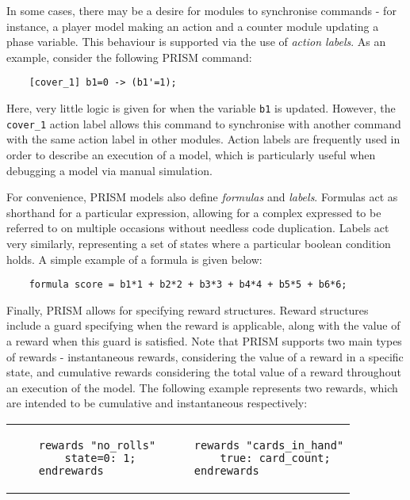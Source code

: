 In some cases, there may be a desire for modules to synchronise commands - for instance, a player model making an action and a counter module updating a phase variable. This behaviour is supported via the use of \emph{action labels}. As an example, consider the following PRISM command:

\begin{verbatim}
    [cover_1] b1=0 -> (b1'=1);
\end{verbatim}

Here, very little logic is given for when the variable \verb+b1+ is updated. However, the \verb+cover_1+ action label allows this command to synchronise with another command with the same action label in other modules. Action labels are frequently used in order to describe an execution of a model, which is particularly useful when debugging a model via manual simulation.

For convenience, PRISM models also define \emph{formulas} and \emph{labels}. Formulas act as shorthand for a particular expression, allowing for a complex expressed to be referred to on multiple occasions without needless code duplication. Labels act very similarly, representing a set of states where a particular boolean condition holds. A simple example of a formula is given below:

\begin{verbatim}
    formula score = b1*1 + b2*2 + b3*3 + b4*4 + b5*5 + b6*6;
\end{verbatim}

Finally, PRISM allows for specifying reward structures. Reward structures include a guard specifying when the reward is applicable, along with the value of a reward when this guard is satisfied. Note that PRISM supports two main types of rewards - instantaneous rewards, considering the value of a reward in a specific state, and cumulative rewards considering the total value of a reward throughout an execution of the model.  The following example represents two rewards, which are intended to be cumulative and instantaneous respectively:

\begin{tabular}{ll}
\begin{minipage}{3in}
\begin{verbatim}
    rewards "no_rolls"
        state=0: 1;
    endrewards
\end{verbatim}
\end{minipage} &
\begin{minipage}{3in}
\begin{verbatim}
    rewards "cards_in_hand"
        true: card_count;
    endrewards
\end{verbatim}
\end{minipage} 
\end{tabular}

